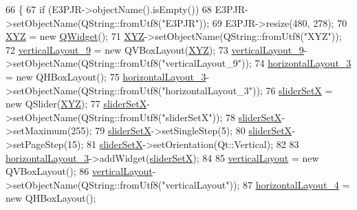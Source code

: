 \begin{DoxyCode}
66     \{
67         \textcolor{keywordflow}{if} (E3PJR->objectName().isEmpty())
68             E3PJR->setObjectName(QString::fromUtf8(\textcolor{stringliteral}{"E3PJR"}));
69         E3PJR->resize(480, 278);
70         \hyperlink{class_ui___e3_p_j_r_a098a80b873d9e0a09fd834f09e5028b4}{XYZ} = \textcolor{keyword}{new} \hyperlink{class_q_widget}{QWidget}();
71         \hyperlink{class_ui___e3_p_j_r_a098a80b873d9e0a09fd834f09e5028b4}{XYZ}->setObjectName(QString::fromUtf8(\textcolor{stringliteral}{"XYZ"}));
72         \hyperlink{class_ui___e3_p_j_r_a7c00a0b53a83fa0709131b996a6249a9}{verticalLayout\_9} = \textcolor{keyword}{new} QVBoxLayout(\hyperlink{class_ui___e3_p_j_r_a098a80b873d9e0a09fd834f09e5028b4}{XYZ});
73         \hyperlink{class_ui___e3_p_j_r_a7c00a0b53a83fa0709131b996a6249a9}{verticalLayout\_9}->setObjectName(QString::fromUtf8(\textcolor{stringliteral}{"verticalLayout\_9"}));
74         \hyperlink{class_ui___e3_p_j_r_af1b2167ad3027fe2c2328701164e54ec}{horizontalLayout\_3} = \textcolor{keyword}{new} QHBoxLayout();
75         \hyperlink{class_ui___e3_p_j_r_af1b2167ad3027fe2c2328701164e54ec}{horizontalLayout\_3}->setObjectName(QString::fromUtf8(\textcolor{stringliteral}{"horizontalLayout\_3"}));
76         \hyperlink{class_ui___e3_p_j_r_ac45c355780da0c571a472ccb5f74c977}{sliderSetX} = \textcolor{keyword}{new} QSlider(\hyperlink{class_ui___e3_p_j_r_a098a80b873d9e0a09fd834f09e5028b4}{XYZ});
77         \hyperlink{class_ui___e3_p_j_r_ac45c355780da0c571a472ccb5f74c977}{sliderSetX}->setObjectName(QString::fromUtf8(\textcolor{stringliteral}{"sliderSetX"}));
78         \hyperlink{class_ui___e3_p_j_r_ac45c355780da0c571a472ccb5f74c977}{sliderSetX}->setMaximum(255);
79         \hyperlink{class_ui___e3_p_j_r_ac45c355780da0c571a472ccb5f74c977}{sliderSetX}->setSingleStep(5);
80         \hyperlink{class_ui___e3_p_j_r_ac45c355780da0c571a472ccb5f74c977}{sliderSetX}->setPageStep(15);
81         \hyperlink{class_ui___e3_p_j_r_ac45c355780da0c571a472ccb5f74c977}{sliderSetX}->setOrientation(Qt::Vertical);
82 
83         \hyperlink{class_ui___e3_p_j_r_af1b2167ad3027fe2c2328701164e54ec}{horizontalLayout\_3}->addWidget(\hyperlink{class_ui___e3_p_j_r_ac45c355780da0c571a472ccb5f74c977}{sliderSetX});
84 
85         \hyperlink{class_ui___e3_p_j_r_ad85f9339d941aa92fe82db7dcba6664c}{verticalLayout} = \textcolor{keyword}{new} QVBoxLayout();
86         \hyperlink{class_ui___e3_p_j_r_ad85f9339d941aa92fe82db7dcba6664c}{verticalLayout}->setObjectName(QString::fromUtf8(\textcolor{stringliteral}{"verticalLayout"}));
87         \hyperlink{class_ui___e3_p_j_r_aeb3eff1a8b0673c92f1ed957263d272b}{horizontalLayout\_4} = \textcolor{keyword}{new} QHBoxLayout();

\end{DoxyCode}

